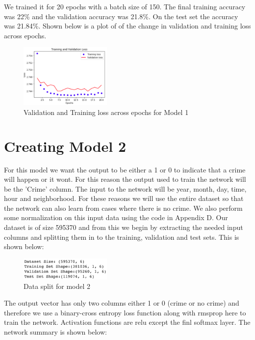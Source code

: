 \documentclass[conference]{IEEEtran}
\begin{document}
    We trained it for 20 epochs with a batch size of 150. The final training accuracy was 22\% and the validation accuracy
    was 21.8\%. On the test set the accuracy was 21.84\%. Shown below is a plot of of the change in validation and training loss across epochs.

    \begin{figure}[H]
        \centering
        \captionsetup{justification=centering}
        \centering
            \includegraphics[width=0.4\textwidth]{m1_t.png}
            \caption{Validation and Training loss across epochs for Model 1}
    \end{figure}

    \section{Creating Model 2}

    For this model we want the output to be either a 1 or 0 to indicate that a crime will happen or it wont. For this reason the output used to train the network
    will be the 'Crime' column. The input to the network will be year, month, day, time, hour and neighborhood. For these reasons we will use the entire dataset so
    that the network can also learn from cases where there is no crime. We also perform some normalization on this input data using the code in Appendix D. Our dataset is of size 595370 and from this we begin by extracting
    the needed input columns and splitting them in to the training, validation and test sets. This is shown below:

    \begin{figure}[H]
        \centering
        \captionsetup{justification=centering}
        \centering
            \includegraphics[width=0.4\textwidth]{m2.png}
            \caption{Data split for model 2}
    \end{figure}

    The output vector has only two columns either 1 or 0 (crime or no crime) and therefore we use a binary-cross entropy loss function along with rmsprop here to train the network. Activation functions are relu except the finl softmax layer. The
    network summary is shown below:
\end{document}
